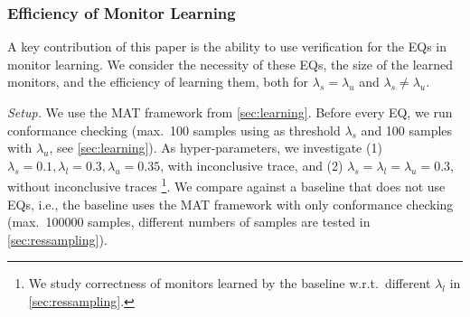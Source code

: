 \documentclass[runningheads]{llncs}
\newcommand{\appcite}[2]{#2} %
\renewcommand{\paragraph}[1]{\smallskip\noindent\emph{#1}}
\begin{document}


\subsubsection{Efficiency of Monitor Learning}
A key contribution of this paper is the ability to use verification for the EQs in monitor learning.
We consider the necessity of these EQs, the size of the learned monitors, and the efficiency of learning them, both for $\lambda_s = \lambda_u$ and $\lambda_s \neq \lambda_u$.

\paragraph{Setup.}
We use the MAT framework from \cref{sec:learning}.
Before every EQ, we run conformance checking (max.\ 100 samples using as threshold $\lambda_s$ and 100 samples with $\lambda_u$, see \cref{sec:learning}).
As hyper-parameters, we investigate (1) $\lambda_s = 0.1, \lambda_l = 0.3, \lambda_u = 0.35$, with inconclusive trace, and (2) $\lambda_s = \lambda_l = \lambda_u = 0.3$, without inconclusive traces%
\footnote{We study correctness of monitors learned by the baseline w.r.t.\ different $\lambda_l$ in \appcite{\cite[App. D]{TR}}{\cref{sec:ressampling}}.}.
We compare against a baseline that does not use EQs, i.e., the baseline uses the MAT framework with only conformance checking (max.\ 100000 samples, different numbers of samples are tested in \appcite{\cite[App. D]{TR}}{\cref{sec:ressampling}}).
\end{document}
